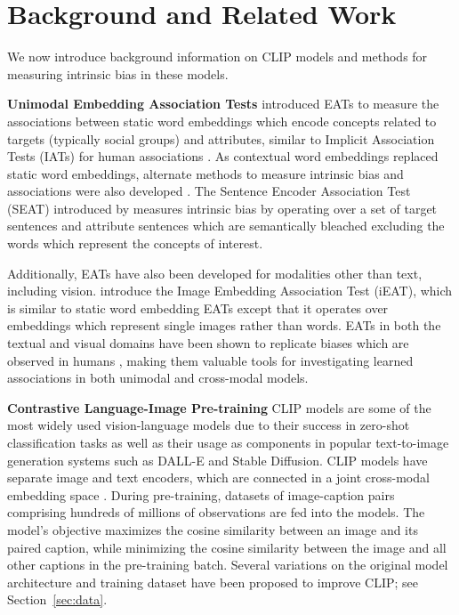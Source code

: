 \section{Background and Related Work}
\label{sec:rw}
We now introduce background information on CLIP models and methods for measuring intrinsic bias in these models.

\noindent\textbf{Unimodal Embedding Association Tests}
\citet{Caliskan2017SemanticsBiases} introduced EATs to measure the associations between static word embeddings which encode concepts related to targets (typically social groups) and attributes, similar to Implicit Association Tests (IATs) for human associations \citep{greenwald1998measuring}. As contextual word embeddings replaced static word embeddings, alternate methods to measure intrinsic bias and associations were also developed \citep{Guo2021DetectingBiases, May2019OnEncoders}. The Sentence Encoder Association Test (SEAT) introduced by \citet{May2019OnEncoders} measures intrinsic bias by operating over a set of  target sentences and attribute sentences which are semantically bleached excluding the words which represent the concepts of interest.  

Additionally, EATs have also been developed for modalities other than text, including vision. \citet{Steed2021} introduce the Image Embedding Association Test (iEAT), which is similar to static word embedding EATs except that it operates over embeddings which represent single images rather than words. EATs in both the textual and visual domains have been shown to replicate biases which are observed in humans \cite{Caliskan2017SemanticsBiases, Steed2021}, making them valuable tools for investigating learned associations in both unimodal and cross-modal models. 

\noindent\textbf{Contrastive Language-Image Pre-training} 
CLIP models are some of the most widely used vision-language models due to their success in zero-shot classification tasks \citep{Radford2021LearningSupervision} as well as their usage as components in popular text-to-image generation systems such as DALL-E and Stable Diffusion. CLIP models have separate image and text encoders, which are connected in a joint cross-modal embedding space \citep{Radford2018ImprovingPre-Training}.  During pre-training, datasets of image-caption pairs comprising hundreds of millions of observations are fed into the models. The model's objective maximizes the cosine similarity between an image and its paired caption, while minimizing the cosine similarity between the image and all other captions in the pre-training batch. Several variations on the original model architecture and training dataset have been proposed to improve CLIP; see Section~\ref{sec:data}.


